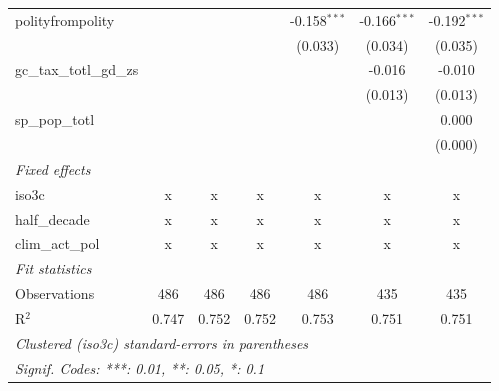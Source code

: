 \begin{tabular}{lcccccc}
   polityfrompolity                                               &         &                &                & -0.158$^{***}$ & -0.166$^{***}$ & -0.192$^{***}$\\   
                                                                  &         &                &                & (0.033)        & (0.034)        & (0.035)\\   
   gc\_tax\_totl\_gd\_zs                                          &         &                &                &                & -0.016         & -0.010\\   
                                                                  &         &                &                &                & (0.013)        & (0.013)\\   
   sp\_pop\_totl                                                  &         &                &                &                &                & 0.000\\   
                                                                  &         &                &                &                &                & (0.000)\\   
   \emph{Fixed effects}\\
   iso3c                                                          & x       & x              & x              & x              & x              & x\\  
   half\_decade                                                   & x       & x              & x              & x              & x              & x\\  
   clim\_act\_pol                                                 & x       & x              & x              & x              & x              & x\\  
   \midrule \emph{Fit statistics}\\
   Observations                                                   & 486     & 486            & 486            & 486            & 435            & 435\\  
   R$^2$                                                          & 0.747   & 0.752          & 0.752          & 0.753          & 0.751          & 0.751\\  
   \midrule
   \multicolumn{7}{l}{\emph{Clustered (iso3c) standard-errors in parentheses}}\\
   \multicolumn{7}{l}{\emph{Signif. Codes: ***: 0.01, **: 0.05, *: 0.1}}\\
\end{tabular}
\par\endgroup


